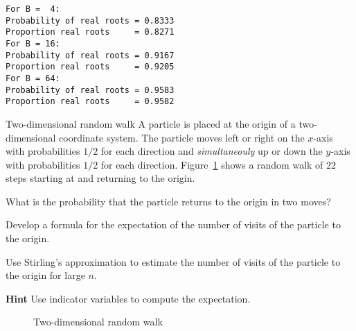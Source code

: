 \newpage

\sml{}
\begin{verbatim}
For B =  4:
Probability of real roots = 0.8333
Proportion real roots     = 0.8271
For B = 16:
Probability of real roots = 0.9167
Proportion real roots     = 0.9205
For B = 64:
Probability of real roots = 0.9583
Proportion real roots     = 0.9582
\end{verbatim}


\begin{prob}{Two-dimensional random walk}
A particle is placed at the origin of a two-dimensional coordinate system. The particle moves left or right on the $x$-axis with probabilities $1/2$ for each direction and \emph{simultaneouly} up or down the $y$-axis with probabilities $1/2$ for each direction. Figure~\ref{f.2d-random-walk} shows a random walk of $22$ steps starting at and returning to the origin.

 What is the probability that the particle returns to the origin in two moves?

 Develop a formula for the expectation of the number of visits of the particle to the origin.

 Use Stirling's approximation to estimate the number of visits of the particle to the origin for large $n$.

\textbf{Hint} Use indicator variables to compute the expectation.

\begin{figure}[t]
\begin{center}
\end{center}
\caption{Two-dimensional random walk}\label{f.2d-random-walk}
\end{figure}
\end{prob}

